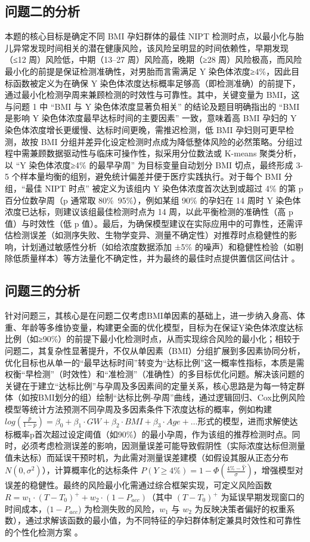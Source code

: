 \documentclass[withoutpreface,bwprint]{cumcmthesis} %
\begin{document}
\subsection{问题二的分析}

本题的核心目标是确定不同 BMI 孕妇群体的最佳 NIPT 检测时点，以最小化与胎儿异常发现时间相关的潜在健康风险，该风险呈明显的时间依赖性，早期发现（≤12 周）风险低，中期（13–27 周）风险高，晚期（≥28 周）风险极高，而风险最小化的前提是保证检测准确性，对男胎而言需满足 Y 染色体浓度≥4\%，因此目标函数被定义为在确保 Y 染色体浓度达标概率足够高（即检测准确）的前提下，通过最小化检测孕周来兼顾检测的时效性与可靠性。其中，关键变量为 BMI，这与问题 1 中 “BMI 与 Y 染色体浓度显著负相关” 的结论及题目明确指出的 “BMI 是影响 Y 染色体浓度最早达标时间的主要因素” 一致，意味着高 BMI 孕妇的 Y 染色体浓度增长更缓慢、达标时间更晚，需推迟检测，低 BMI 孕妇则可更早检测，故按 BMI 分组并差异化设定检测时点成为降低整体风险的必然策略。分组过程中需兼顾数据驱动性与临床可操作性，拟采用分位数法或 K-means 聚类分析，以 “Y 染色体浓度≥4\% 的最早孕周” 为目标变量自动划分 BMI 切点，最终形成 3-5 个样本量均衡的组别，避免统计偏差并便于医疗实践执行。对于每个 BMI 分组，“最佳 NIPT 时点” 被定义为该组内 Y 染色体浓度首次达到或超过 4\% 的第 p 百分位数孕周（p 通常取 80\%~95\%），例如某组 90\% 的孕妇在 14 周时 Y 染色体浓度已达标，则建议该组最佳检测时点为 14 周，以此平衡检测的准确性（高 p 值）与时效性（低 p 值）。最后，为确保模型建议在实际应用中的可靠性，还需评估检测误差（如测序失败、生物学变异、测量不确定性）对推荐时点稳健性的影响，计划通过敏感性分析（如给浓度数据添加 ±5\% 的噪声）和稳健性检验（如剔除低质量样本）等方法量化不确定性，并为最终的最佳时点提供置信区间估计 。


\subsection{问题三的分析}

针对问题三，其核心是在问题二仅考虑BMI单因素的基础上，进一步纳入身高、体重、年龄等多维协变量，构建更全面的优化模型，目标为在保证Y染色体浓度达标比例（如≥90\%）的前提下最小化检测时点，从而实现综合风险的最小化；相较于问题二，其复杂性显著提升，不仅从单因素（BMI）分组扩展到多因素协同分析，优化目标也从单一的“最早达标时间”转变为“达标比例”这一概率性指标，本质是需权衡“早检测”（时效性）和“准检测”（准确性）的多目标优化问题。解决该问题的关键在于建立“达标比例”与孕周及多因素间的定量关系，核心思路是为每一特定群体（如按BMI划分的组）绘制“达标比例-孕周”曲线，通过逻辑回归、Cox比例风险模型等统计方法预测不同孕周及多因素条件下浓度达标的概率，例如构建 $log(\frac{p}{1-p}) = \beta_0 + \beta_1 \cdot GW + \beta_2 \cdot BMI + \beta_3 \cdot Age + \ldots$形式的模型，进而求解使达标概率p首次超过设定阈值（如90\%）的最小孕周，作为该组的推荐检测时点。同时，必须考虑检测误差的影响，因测量误差可能导致假阴性（实际浓度达标但测量值未达标）而延误干预时机，为此需对测量误差建模（如假设其服从正态分布 $N(0, \sigma^2)$），计算概率化的达标条件 $P(Y \geq 4\%) = 1 - \Phi(\frac{4\% - \hat{Y}}{\sigma})$，增强模型对误差的稳健性。最终的风险最小化需通过综合框架实现，可定义风险函数 $R = w_1 \cdot (T - T_0)^+ + w_2 \cdot (1 - P_{acc})$（其中 $(T - T_0)^+$ 为延误早期发现窗口的时间成本，($1 - P_{acc}$) 为检测失败的风险，$w_1$ 与 $w_2$ 为反映决策者偏好的权重系数），通过求解该函数的最小值，为不同特征的孕妇群体制定兼具时效性和可靠性的个性化检测方案 。
\end{document}
